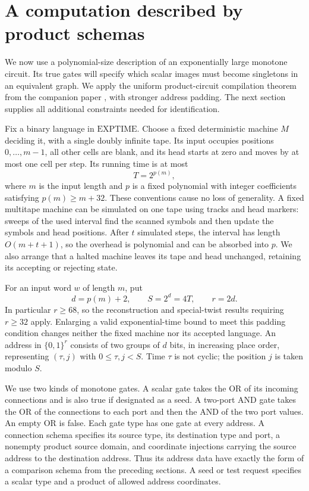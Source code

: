 \section{A computation described by product schemas}
\label{sec:computation}

We now use a polynomial-size description of an exponentially large
monotone circuit. Its true gates will specify which scalar images must become
singletons in an equivalent graph. We apply the uniform product-circuit
compilation theorem from the companion paper \cite{VariableWL}, with
stronger address padding. The next section
supplies all additional constraints needed for identification.

Fix a binary language in \(\mathrm{EXPTIME}\).  Choose a fixed deterministic
machine \(M\) deciding it, with a single doubly infinite tape. Its input
occupies positions \(0,\ldots,m-1\), all other cells are blank, and its
head starts at zero and moves by at most one cell per step. Its running time is at most
\[
 T=2^{p(m)},
\]
where \(m\) is the input length and \(p\) is a fixed polynomial with integer
coefficients satisfying \(p(m)\ge m+32\).  These conventions cause no loss of
generality.  A fixed multitape machine can be simulated on one tape using
tracks and head markers: sweeps of the used interval find the scanned symbols
and then update the symbols and head positions.  After \(t\) simulated steps,
the interval has length \(O(m+t+1)\), so the overhead is polynomial and can be
absorbed into \(p\).  We also arrange that a halted machine leaves its tape and
head unchanged, retaining its accepting or rejecting state.

For an input word \(w\) of length \(m\), put
\begin{equation}
 d=p(m)+2,\qquad S=2^d=4T,\qquad r=2d.
 \label{eq:computation-parameters}
\end{equation}
In particular $r\ge68$, so the reconstruction and special-twist results
requiring $r\ge32$ apply. Enlarging a valid exponential-time bound to
meet this padding condition changes neither the fixed machine nor its
accepted language.
An address in \(\{0,1\}^r\) consists of two groups of \(d\) bits, in increasing
place order, representing \((\tau,j)\) with \(0\le \tau,j<S\).  Time \(\tau\)
is not cyclic; the position \(j\) is taken modulo \(S\).

We use two kinds of monotone gates.  A scalar gate takes the OR of its incoming
connections and is also true if designated as a seed.  A two-port AND gate
takes the OR of the connections to each port and then the AND of the two port
values.  An empty OR is false.  Each gate type has one gate at every address.
A connection schema specifies its source type, its destination type and port,
a nonempty product source domain, and coordinate injections carrying the
source address to the destination address.  Thus its address data have exactly
the form of a comparison schema from the preceding sections.  A seed or test
request specifies a scalar type and a product of allowed address coordinates.

